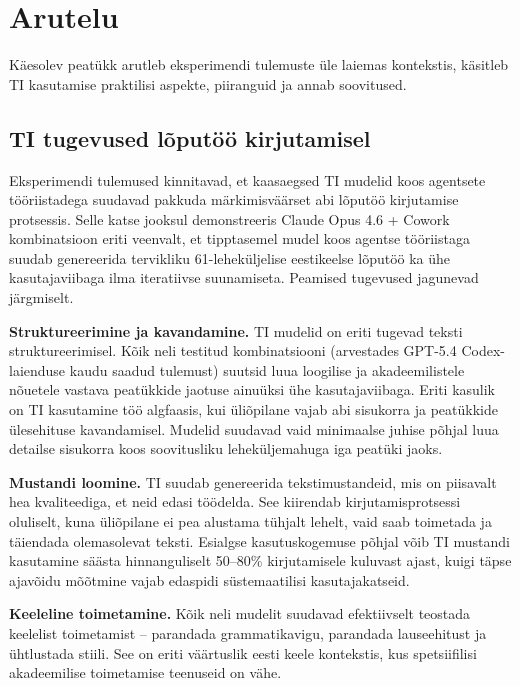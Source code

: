\section{Arutelu} \label{arutelu}

Käesolev peatükk arutleb eksperimendi tulemuste üle laiemas kontekstis, käsitleb TI kasutamise praktilisi aspekte, piiranguid ja annab soovitused.

\subsection{TI tugevused lõputöö kirjutamisel} \label{subsec:tugevused}

Eksperimendi tulemused kinnitavad, et kaasaegsed TI mudelid koos agentsete tööriistadega suudavad pakkuda märkimisväärset abi lõputöö kirjutamise protsessis. Selle katse jooksul demonstreeris Claude Opus 4.6 + Cowork kombinatsioon eriti veenvalt, et tipptasemel mudel koos agentse tööriistaga suudab genereerida tervikliku 61-leheküljelise eestikeelse lõputöö ka ühe kasutajaviibaga ilma iteratiivse suunamiseta. Peamised tugevused jagunevad järgmiselt.

\textbf{Struktureerimine ja kavandamine.} TI mudelid on eriti tugevad teksti struktureerimisel. Kõik neli testitud kombinatsiooni (arvestades GPT-5.4 Codex-laienduse kaudu saadud tulemust) suutsid luua loogilise ja akadeemilistele nõuetele vastava peatükkide jaotuse ainuüksi ühe kasutajaviibaga. Eriti kasulik on TI kasutamine töö algfaasis, kui üliõpilane vajab abi sisukorra ja peatükkide ülesehituse kavandamisel. Mudelid suudavad vaid minimaalse juhise põhjal luua detailse sisukorra koos soovitusliku leheküljemahuga iga peatüki jaoks.

\textbf{Mustandi loomine.} TI suudab genereerida tekstimustandeid, mis on piisavalt hea kvaliteediga, et neid edasi töödelda. See kiirendab kirjutamisprotsessi oluliselt, kuna üliõpilane ei pea alustama tühjalt lehelt, vaid saab toimetada ja täiendada olemasolevat teksti. Esialgse kasutuskogemuse põhjal võib TI mustandi kasutamine säästa hinnanguliselt 50--80\% kirjutamisele kuluvast ajast, kuigi täpse ajavõidu mõõtmine vajab edaspidi süstemaatilisi kasutajakatseid.

\textbf{Keeleline toimetamine.} Kõik neli mudelit suudavad efektiivselt teostada keelelist toimetamist -- parandada grammatikavigu, parandada lauseehitust ja ühtlustada stiili. See on eriti väärtuslik eesti keele kontekstis, kus spetsiifilisi akadeemilise toimetamise teenuseid on vähe.


